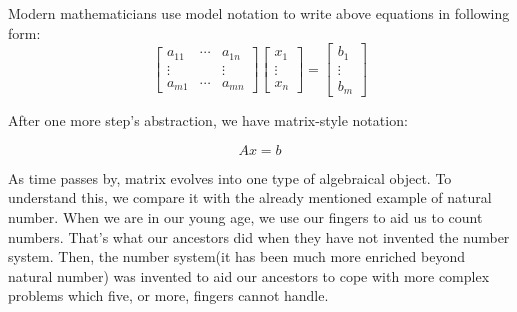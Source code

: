 \documentclass[a4paper]{book}
\begin{document}
    Modern mathematicians use model notation to write above equations in
    following form:
    \begin{displaymath}
      \begin{bmatrix}
        a_{11} & \cdots & a_{1n} \\
        \vdots &        & \vdots \\
        a_{m1} & \cdots & a_{mn} 
      \end{bmatrix}
      \begin{bmatrix}
        x_{1} \\
        \vdots \\
        x_{n} 
      \end{bmatrix}
      =
      \begin{bmatrix}
        b_{1} \\
        \vdots \\
        b_{m} 
      \end{bmatrix}
    \end{displaymath}

    After one more step's abstraction, we have matrix-style notation:

    \begin{equation}
      Ax = b
      \label{eq:matrix_form_linear_equations}
    \end{equation}

    As time passes by, matrix evolves into one type of algebraical
    object. To understand this, we compare it with the already mentioned
    example of natural number. When we are in our young age, we use our
    fingers to aid us to count numbers.  That's what our ancestors did
    when they have not invented the number system.  Then, the number
    system(it has been much more enriched beyond natural number) was
    invented to aid our ancestors to cope with more complex problems
    which five, or more, fingers cannot handle.
\end{document}
